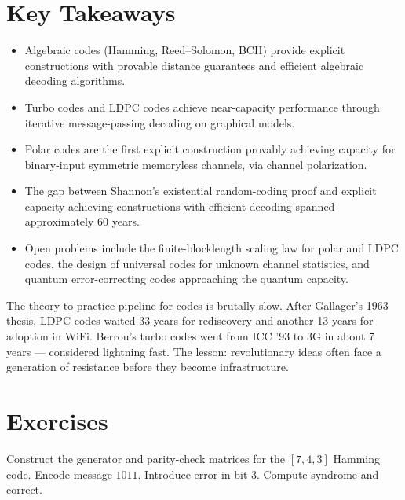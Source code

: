 \section*{Key Takeaways}
\begin{itemize}
\item Algebraic codes (Hamming, Reed--Solomon, BCH) provide explicit constructions with provable distance guarantees and efficient algebraic decoding algorithms.
\item Turbo codes and LDPC codes achieve near-capacity performance through iterative message-passing decoding on graphical models.
\item Polar codes are the first explicit construction provably achieving capacity for binary-input symmetric memoryless channels, via channel polarization.
\item The gap between Shannon's existential random-coding proof and explicit capacity-achieving constructions with efficient decoding spanned approximately 60 years.
\item Open problems include the finite-blocklength scaling law for polar and LDPC codes, the design of universal codes for unknown channel statistics, and quantum error-correcting codes approaching the quantum capacity.
\end{itemize}

The theory-to-practice pipeline for codes is brutally slow. After Gallager's 1963 thesis, LDPC codes waited 33 years for rediscovery and another 13 years for adoption in WiFi. Berrou's turbo codes went from ICC '93 to 3G in about 7 years — considered lightning fast. The lesson: revolutionary ideas often face a generation of resistance before they become infrastructure.

\section{Exercises}
\label{sec:ec:exercises}

\begin{exercise}[Basic]
Construct the generator and parity-check matrices for the $[7,4,3]$ Hamming code. Encode message $1011$. Introduce error in bit 3. Compute syndrome and correct.
\end{exercise}

